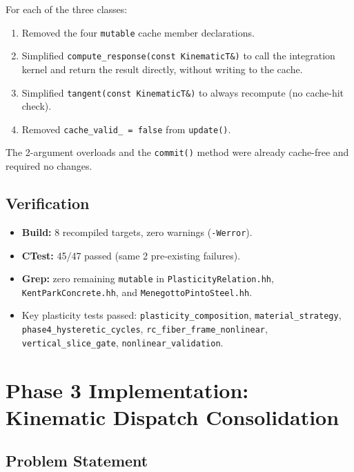 For each of the three classes:
\begin{enumerate}
  \item Removed the four \texttt{mutable} cache member declarations.
  \item Simplified \texttt{compute\_response(const KinematicT\&)} to
        call the integration kernel and return the result directly,
        without writing to the cache.
  \item Simplified \texttt{tangent(const KinematicT\&)} to always
        recompute (no cache-hit check).
  \item Removed \texttt{cache\_valid\_ = false} from \texttt{update()}.
\end{enumerate}

The 2-argument overloads and the \texttt{commit()} method were
already cache-free and required no changes.

\subsection{Verification}

\begin{itemize}
  \item \textbf{Build:} 8 recompiled targets, zero warnings (\texttt{-Werror}).
  \item \textbf{CTest:} 45/47 passed (same 2 pre-existing failures).
  \item \textbf{Grep:} zero remaining \texttt{mutable} in
        \texttt{PlasticityRelation.hh},
        \texttt{KentParkConcrete.hh}, and
        \texttt{MenegottoPintoSteel.hh}.
  \item Key plasticity tests passed:
        \texttt{plasticity\_composition},
        \texttt{material\_strategy},
        \texttt{phase4\_hysteretic\_cycles},
        \texttt{rc\_fiber\_frame\_nonlinear},
        \texttt{vertical\_slice\_gate},
        \texttt{nonlinear\_validation}.
\end{itemize}


\section{Phase 3 Implementation: Kinematic Dispatch Consolidation}
\label{sec:phase3-dispatch}

\subsection{Problem Statement}

